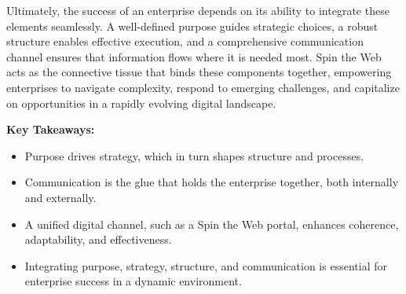 \bigskip
Ultimately, the success of an enterprise depends on its ability to integrate these elements seamlessly. A well-defined purpose guides strategic choices, a robust structure enables effective execution, and a comprehensive communication channel ensures that information flows where it is needed most. Spin the Web acts as the connective tissue that binds these components together, empowering enterprises to navigate complexity, respond to emerging challenges, and capitalize on opportunities in a rapidly evolving digital landscape.

\bigskip
\noindent\textbf{Key Takeaways:}
\begin{itemize}
	\item Purpose drives strategy, which in turn shapes structure and processes.
	\item Communication is the glue that holds the enterprise together, both internally and externally.
	\item A unified digital channel, such as a Spin the Web portal, enhances coherence, adaptability, and effectiveness.
	\item Integrating purpose, strategy, structure, and communication is essential for enterprise success in a dynamic environment.
\end{itemize}
